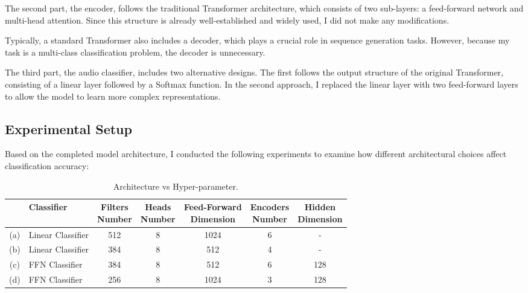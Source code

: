 \documentclass{article}
\begin{document}
      The second part, the encoder, follows the traditional Transformer architecture, which consists of two sub-layers: a feed-forward network and multi-head attention. Since this structure is already well-established and widely used, I did not make any modifications.

      Typically, a standard Transformer also includes a decoder, which plays a crucial role in sequence generation tasks. However, because my task is a multi-class classification problem, the decoder is unnecessary.

      The third part, the audio classifier, includes two alternative designs. The first follows the output structure of the original Transformer, consisting of a linear layer followed by a Softmax function. In the second approach, I replaced the linear layer with two feed-forward layers to allow the model to learn more complex representations.

    \subsection{Experimental Setup}

      Based on the completed model architecture, I conducted the following experiments to examine how different architectural choices affect classification accuracy:

      \begin{table}[H]
        \caption{Architecture vs Hyper-parameter.}
        \label{tbl:arch_hyper_param}
        \centering
        \begin{tabularx}{\textwidth}{clccccc}
          \toprule
           & Classifier
                  & \makecell{Filters \\ Number} 
                  & \makecell{Heads \\ Number} 
                  & \makecell{Feed-Forward \\ Dimension} 
                  & \makecell{Encoders \\ Number} 
                  & \makecell{Hidden \\ Dimension} \\
          \midrule
          (a) & Linear Classifier & 512                       & 8             & 1024                    & 6               & - \\
          (b) & Linear Classifier & 384                       & 8             & 512                     & 4               & - \\
          (c) & FFN Classifier    & 384                       & 8             & 512                     & 6               & 128 \\
          (d) & FFN Classifier    & 256                       & 8             & 1024                    & 3               & 128 \\
          \bottomrule
        \end{tabularx}
      \end{table}
\end{document}
